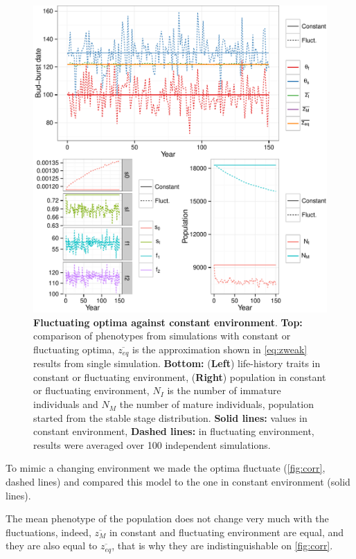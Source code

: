\begin{figure}[ht!]
	\centering
	\includegraphics[scale=1]{Figures/PhenoLHTwithCorr.pdf}
	\caption{\textbf{Fluctuating optima against constant environment}. \textbf{Top:} comparison of phenotypes from simulations with constant or fluctuating optima, $\overline{z_{eq}}$ is the approximation shown in \autoref{eq:zweak} results from single simulation. \textbf{Bottom:} (\textbf{Left}) life-history traits in constant or fluctuating environment, (\textbf{Right}) population in constant or fluctuating environment, $N_I$ is the number of immature individuals and $N_M$ the number of mature individuals, population started from the stable stage distribution. \textbf{Solid lines:} values in constant environment, \textbf{Dashed lines:} in fluctuating environment, results were averaged over 100 independent simulations.}
	\label{fig:corr}
\end{figure}

To mimic a changing environment we made the optima fluctuate (\autoref{fig:corr}, dashed lines) and compared this model to the one in constant environment (solid lines).

The mean phenotype of the population does not change very much with the fluctuations, indeed, $\overline{z_M}$ in constant and fluctuating environment are equal, and they are also equal to $\overline{z_{eq}}$, that is why they are indistinguishable on \autoref{fig:corr}.

